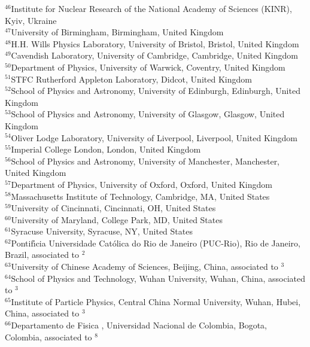 \documentclass[12pt,a4paper]{article}
\begin{document}
\begin{flushleft}
{$ ^{46}$Institute for Nuclear Research of the National Academy of Sciences (KINR), Kyiv, Ukraine\\
$ ^{47}$University of Birmingham, Birmingham, United Kingdom\\
$ ^{48}$H.H. Wills Physics Laboratory, University of Bristol, Bristol, United Kingdom\\
$ ^{49}$Cavendish Laboratory, University of Cambridge, Cambridge, United Kingdom\\
$ ^{50}$Department of Physics, University of Warwick, Coventry, United Kingdom\\
$ ^{51}$STFC Rutherford Appleton Laboratory, Didcot, United Kingdom\\
$ ^{52}$School of Physics and Astronomy, University of Edinburgh, Edinburgh, United Kingdom\\
$ ^{53}$School of Physics and Astronomy, University of Glasgow, Glasgow, United Kingdom\\
$ ^{54}$Oliver Lodge Laboratory, University of Liverpool, Liverpool, United Kingdom\\
$ ^{55}$Imperial College London, London, United Kingdom\\
$ ^{56}$School of Physics and Astronomy, University of Manchester, Manchester, United Kingdom\\
$ ^{57}$Department of Physics, University of Oxford, Oxford, United Kingdom\\
$ ^{58}$Massachusetts Institute of Technology, Cambridge, MA, United States\\
$ ^{59}$University of Cincinnati, Cincinnati, OH, United States\\
$ ^{60}$University of Maryland, College Park, MD, United States\\
$ ^{61}$Syracuse University, Syracuse, NY, United States\\
$ ^{62}$Pontif{\'\i}cia Universidade Cat{\'o}lica do Rio de Janeiro (PUC-Rio), Rio de Janeiro, Brazil, associated to $^{2}$\\
$ ^{63}$University of Chinese Academy of Sciences, Beijing, China, associated to $^{3}$\\
$ ^{64}$School of Physics and Technology, Wuhan University, Wuhan, China, associated to $^{3}$\\
$ ^{65}$Institute of Particle Physics, Central China Normal University, Wuhan, Hubei, China, associated to $^{3}$\\
$ ^{66}$Departamento de Fisica , Universidad Nacional de Colombia, Bogota, Colombia, associated to $^{8}$\\
}
\end{flushleft}
\end{document}
